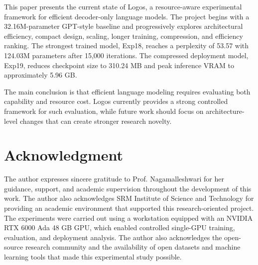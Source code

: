 \documentclass[conference]{IEEEtran}
\begin{document}
This paper presents the current state of Logos, a resource-aware experimental framework for efficient decoder-only language models. The project begins with a 32.16M-parameter GPT-style baseline and progressively explores architectural efficiency, compact design, scaling, longer training, compression, and efficiency ranking. The strongest trained model, Exp18, reaches a perplexity of 53.57 with 124.03M parameters after 15,000 iterations. The compressed deployment model, Exp19, reduces checkpoint size to 310.24 MB and peak inference VRAM to approximately 5.96 GB. 

The main conclusion is that efficient language modeling requires evaluating both capability and resource cost. Logos currently provides a strong controlled framework for such evaluation, while future work should focus on architecture-level changes that can create stronger research novelty.

\section*{Acknowledgment}

The author expresses sincere gratitude to Prof. Nagamalleshwari for her guidance, support, and academic supervision throughout the development of this work. The author also acknowledges SRM Institute of Science and Technology for providing an academic environment that supported this research-oriented project. The experiments were carried out using a workstation equipped with an NVIDIA RTX 6000 Ada 48 GB GPU, which enabled controlled single-GPU training, evaluation, and deployment analysis. The author also acknowledges the open-source research community and the availability of open datasets and machine learning tools that made this experimental study possible.
\end{document}
